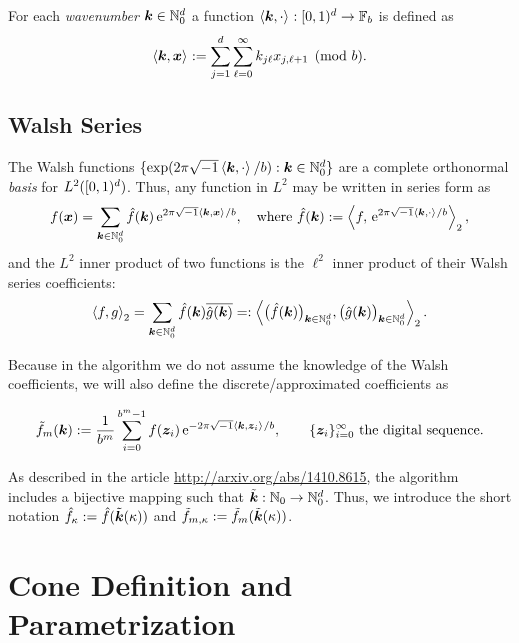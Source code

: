\documentclass{article}
\newcommand{\N}{\mathbb{N}} %
\newcommand{\F}{\mathbb{F}} %
\newcommand{\E}{\,\mathrm{e}} %
\newcommand{\bsx}{\boldsymbol{x}}    %
\newcommand{\bsz}{\boldsymbol{z}}    %
\begin{document}
For each \emph{wavenumber} $\bsk \in \N_0^d$ a function $\ip{\bsk}{\cdot}: \cube \to \F_b$ is defined as
\begin{equation}
\ip{\bsk}{\bsx} := \sum_{j=1}^{d} \sum_{\ell=0}^{\infty} k_{j\ell}x_{j,\ell+1}  \pmod b.
\end{equation}

\subsection{Walsh Series} \label{WaveWalshsec}
The Walsh functions $\{\exp(2 \pi \sqrt{-1} \ip{\bsk}{\cdot}/b) : \bsk \in \N_0^d\}$ are a complete orthonormal \emph{basis} for $L^2([0,1)^d)$.  Thus, any function in $L^2$ may be written in series form as
\begin{equation} \label{Fourierdef}
f(\bsx) = \sum_{\bsk \in \N_0^d} \hf(\bsk) \E^{2 \pi \sqrt{-1} \ip{\bsk}{\bsx}/b}, \quad \text{where } \hf(\bsk) := \ip[2]{f}{\E^{2 \pi \sqrt{-1} \ip{\bsk}{\cdot}/b}},
\end{equation}
and the $L^2$ inner product of two functions  is the $\ell^2$ inner product of their Walsh series coefficients:
\[
\ip[2]{f}{g} = \sum_{\bsk \in \N_0^d} \hf(\bsk)\overline{\hg(\bsk)} =: \ip[2]{\bigl(\hf(\bsk)\bigr)_{\bsk \in \N_0^d}}{\bigl ( \hg(\bsk)\bigr )_{\bsk \in \N_0^d}}.
\]

Because in the algorithm we do not assume the knowledge of the Walsh coefficients, we will also define the discrete/approximated coefficients as

\begin{equation} \label{cubaturedef}
\tf_m(\bsk) := \frac{1}{b^m} \sum_{i=0}^{b^m-1} f(\bsz_i)\E^{-2 \pi \sqrt{-1} \ip{\bsk}{\bsz_i}/b},\qquad \{\bsz_i\}_{i=0}^\infty\text{ the digital sequence.}
\end{equation}

As described in the article \url{http://arxiv.org/abs/1410.8615}, the algorithm includes a bijective mapping such that $\tvk:\N_0\rightarrow\N_0^d$. Thus, we introduce the short notation $\hat{f}_{\kappa} :=\hat{f}(\tilde{\boldsymbol{k}}(\kappa))$  and $\tilde{f}_{m,\kappa} := \tilde{f}_m(\tilde{\boldsymbol{k}}(\kappa))$.


\section{Cone Definition and Parametrization}
\end{document}
